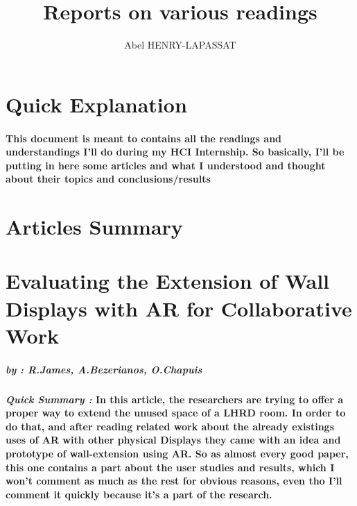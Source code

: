 \documentclass{article}
\title{Reports on various readings}
\author{Abel HENRY-LAPASSAT}
\begin{document}
\maketitle
\section{Quick Explanation}
    \paragraph{ \textnormal{This document is meant to contains all the readings and understandings I'll do during my HCI Internship.
        So basically, I'll be putting in here some articles and what I understood and thought about their topics and conclusions/results} }

\section{Articles Summary}
\section{Evaluating the Extension of Wall Displays with AR for Collaborative Work}
    \subparagraph{by : R.James, A.Bezerianos, O.Chapuis}
    \cite{EEWDARCW:2023-03}
    \paragraph{ \textit{Quick Summary :} 
                \newline
                \indent \indent \textnormal{In this article, the researchers are trying to offer a proper way to extend the unused space
                of a LHRD room. In order to do that, and after reading related work about the already existings uses of AR with other physical Displays
                they came with an idea and prototype of wall-extension using AR. }
                \indent \indent \textnormal{So as almost every good paper, this one contains a part about the user studies and results, which I won't 
                comment as much as the rest for obvious reasons, even tho I'll comment it quickly because it's a part of the research.} }
    
\end{document}
